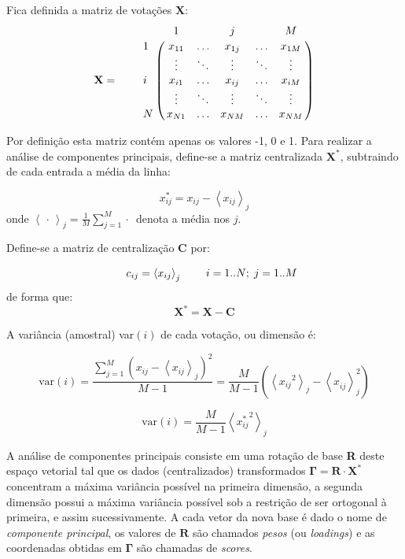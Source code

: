 \documentclass[a4paper, 12pt]{article}
\newcommand{\tikzmark}[1]{\tikz[overlay, remember picture] \coordinate (#1);}
\let\bbordermatrix\bordermatrix
\begin{document}
Fica definida a matriz de votações $\mathbf{X}$:
\medskip{}
\[
  \mathbf{X} = \qquad \bbordermatrix{~  & \tikzmark{harrowleft} 1 & ~ & j & ~
                        & M\tikzmark{harrowright}  \cr
                    \tikzmark{varrowtop} 
                    1 & x_{11} & \ldots & x_{1j} & \ldots & x_{1M} \cr
                    ~ & \vdots & \ddots & \vdots & \ddots & \vdots \cr
                    i & x_{i1} & \ldots & x_{ij} & \ldots & x_{iM} \cr
                    ~ & \vdots & \ddots & \vdots & \ddots & \vdots \cr
                    \tikzmark{varrowbottom}
                    N & x_{N1} & \ldots & x_{NM} & \ldots & x_{NM} \cr
                    }
\]

Por definição esta matriz contém apenas os valores -1, 0 e 1. Para realizar a análise de componentes principais, define-se a matriz centralizada $\mathbf{X^{*}}$, subtraindo de cada entrada a média da linha:

\begin{equation}
  x_{ij}^{*} = x_{ij} - \left< x_{ij} \right>_j 
  \label{eq:x-estrela}
\end{equation}
onde $\left< \,\cdot\, \right>_j = \frac{1}{M}\sum_{j=1}^{M} \cdot\,$ denota a média nos $j$.

Define-se a matriz de centralização $\mathbf{C}$ por:

\[
  \begin{array}{r r r r}
    ~ & c_{ij} = \left< x_{ij} \right>_{j} & ~ & i=1..N;\;j=1..M \\
  \end{array}
\]
de forma que:
\[
  \mathbf{X^{*}} = \mathbf{X} - \mathbf{C}
\]

A variância (amostral) var$(i)$ de cada votação, ou dimensão é:

\[
\mathrm{var}(i) = \frac{\sum_{j=1}^M \left( x_{ij} - \left< x_{ij} \right>_j \right)^2 }{M-1}
= \frac{M}{M-1}\left(\left< {x_{ij}}^{2} \right>_{j} - \left< x_{ij}^{~}\right>_{j}^{2} \right)
\]

\begin{equation}
\mathrm{var}(i) = \frac{M}{M-1}\left<{x_{ij}^{*}}^{2}\right>_{j}
\label{eq:variancia}
\end{equation}

A análise de componentes principais consiste em uma rotação de base \textbf{R} deste espaço vetorial tal que os dados (centralizados) transformados $\mathbf{\Gamma} = \mathbf{R}\cdot \mathbf{X^{*}}$ concentram a máxima variância possível na primeira dimensão, a segunda dimensão possui a máxima variância possível sob a restrição de ser ortogonal à primeira, e assim sucessivamente. A cada vetor da nova base é dado o nome de \emph{componente principal}, os valores de $\mathbf{R}$ são chamados \emph{pesos} (ou \emph{loadings}) e as coordenadas obtidas em $\mathbf{\Gamma}$ são chamadas de \emph{scores}.
\end{document}
